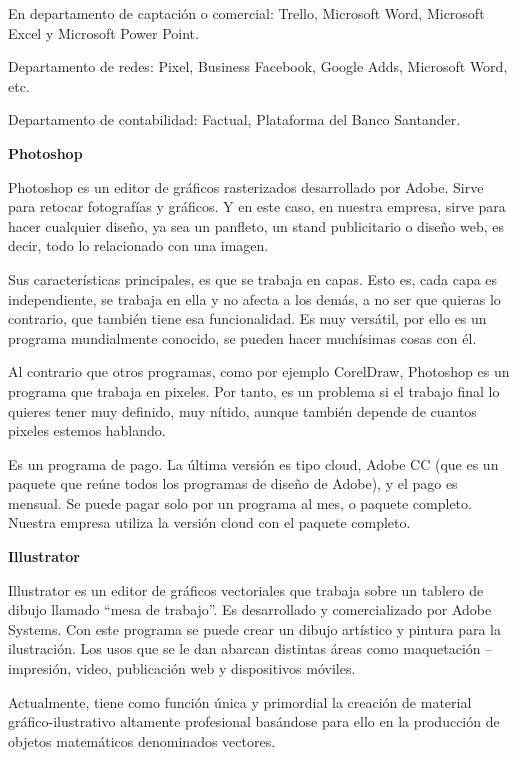 \documentclass{article}
\begin{document}
En departamento de captación o comercial: Trello, Microsoft Word, Microsoft Excel y Microsoft Power Point.  

Departamento de redes: Pixel, Business Facebook, Google Adds, Microsoft Word, etc.  

Departamento de contabilidad: Factual, Plataforma del Banco Santander.  

\vspace{5mm}

\textbf{Photoshop}

Photoshop es un editor de gráficos rasterizados desarrollado por Adobe. Sirve para retocar fotografías y gráficos. Y en este caso, en nuestra empresa, sirve para hacer cualquier diseño, ya sea un panfleto, un stand publicitario o diseño web, es decir, todo lo relacionado con una imagen.  

Sus características principales, es que se trabaja en capas. Esto es, cada capa es independiente, se trabaja en ella y no afecta a los demás, a no ser que quieras lo contrario, que también tiene esa funcionalidad. Es muy versátil, por ello es un programa mundialmente conocido, se pueden hacer muchísimas cosas con él. 

Al contrario que otros programas, como por ejemplo CorelDraw, Photoshop es un programa que trabaja en pixeles. Por tanto, es un problema si el trabajo final lo quieres tener muy definido, muy nítido, aunque también depende de cuantos pixeles estemos hablando.  

Es un programa de pago. La última versión es tipo cloud, Adobe CC (que es un paquete que reúne todos los programas de diseño de Adobe), y el pago es mensual. Se puede pagar solo por un programa al mes, o paquete completo.  Nuestra empresa utiliza la versión cloud con el paquete completo. 

\vspace{5mm}

\textbf{Illustrator}

Illustrator es un editor de gráficos vectoriales que trabaja sobre un tablero de dibujo llamado “mesa de trabajo”. Es desarrollado y comercializado por Adobe Systems. Con este programa se puede crear un dibujo artístico y pintura para la ilustración. Los usos que se le dan abarcan distintas áreas como maquetación – impresión, video, publicación web y dispositivos móviles.  

Actualmente, tiene como función única y primordial la creación de material gráfico-ilustrativo altamente profesional basándose para ello en la producción de objetos matemáticos denominados vectores.  
\end{document}
